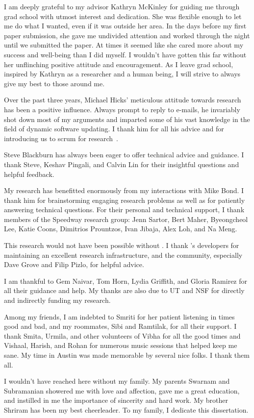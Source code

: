 \begin{acknowledgments}
I am deeply grateful to my advisor Kathryn McKinley for guiding me through
grad school with utmost interest and dedication. She was flexible enough to
let me do what I wanted, even if it was outside her area. In the days
before my first paper submission, she gave me undivided attention and
worked through the night until we submitted the paper.  At times it seemed
like she cared more about my success and well-being than I did myself.  I
wouldn't have gotten this far without her unflinching positive attitude and
encouragement. As I leave grad school, inspired by Kathryn as a researcher
and a human being, I will strive to always give my best to those around me.

Over the past three years, Michael Hicks' meticulous attitude towards
research has been a positive influence. Always prompt to reply to e-mails,
he invariably shot down most of my arguments and imparted some of his vast
knowledge in the field of dynamic software updating. I thank him for all
his advice and for introducing us to scrum for research~\cite{scrum}.

Steve Blackburn has always been eager to offer technical advice and
guidance. I thank Steve, Keshav Pingali, and Calvin Lin for their
insightful questions and helpful feedback.

My research has benefitted enormously from my interactions with Mike Bond.
I thank him for brainstorming engaging research problems as well as for
patiently answering technical questions. For their personal and technical
support, I thank members of the Speedway research group: Jenn Sartor, Bert
Maher, Byeongcheol Lee, Katie Coons, Dimitrios Prountzos, Ivan Jibaja, Alex
Loh, and Na Meng.

This research would not have been possible without \RVM. I thank \RVM's
developers for maintaining an excellent research infrastructure, and the
community, especially Dave Grove and Filip Pizlo, for helpful advice.

I am thankful to Gem Naivar, Tom Horn, Lydia Griffith, and Gloria Ramirez
for all their guidance and help. My thanks are also due to UT and NSF for
directly and indirectly funding my research.

Among my friends, I am indebted to Smriti for her patient listening in
times good and bad, and my roommates, Sibi and Ramtilak, for all their
support. I thank Smita, Urmila, and other volunteers of Vibha for all the
good times and Vishaal, Harish, and Rohan for numerous music sessions that
helped keep me sane. My time in Austin was made memorable by several nice
folks. I thank them all.

I wouldn't have reached here without my family. My parents Swarnam and
Subramanian showered me with love and affection, gave me a great education,
and instilled in me the importance of sincerity and hard work. My brother
Shriram has been my best cheerleader. To my family, I dedicate this
dissertation.
\end{acknowledgments}
